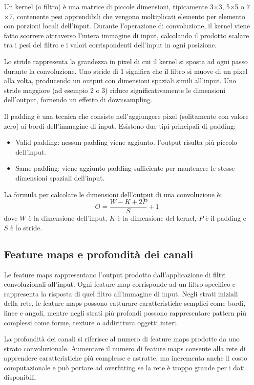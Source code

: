 \documentclass[a4paper,12pt]{report}
\begin{document}
	Un kernel (o filtro) è una matrice di piccole dimensioni, tipicamente 3$\times$3, 5$\times$5 o 7$\times$7, contenente pesi apprendibili che vengono moltiplicati elemento per elemento con porzioni locali dell'input. Durante l'operazione di convoluzione, il kernel viene fatto scorrere attraverso l'intera immagine di input, calcolando il prodotto scalare tra i pesi del filtro e i valori corrispondenti dell'input in ogni posizione.
	
	Lo stride rappresenta la grandezza in pixel di cui il kernel si sposta ad ogni passo durante la convoluzione. Uno stride di 1 significa che il filtro si muove di un pixel alla volta, producendo un output con dimensioni spaziali simili all'input. Uno stride maggiore (ad esempio 2 o 3) riduce significativamente le dimensioni dell'output, fornendo un effetto di downsampling.
	
	Il padding è una tecnica che consiste nell'aggiungere pixel (solitamente con valore zero) ai bordi dell'immagine di input. Esistono due tipi principali di padding:
	\begin{itemize}
		\item Valid padding: nessun padding viene aggiunto, l'output risulta più piccolo dell'input.
		\item Same padding: viene aggiunto padding sufficiente per mantenere le stesse dimensioni spaziali dell'input.
	\end{itemize}
	La formula per calcolare le dimensioni dell'output di una convoluzione è:
	$$O = \frac{W - K + 2P}{S} + 1$$
	dove $W$ è la dimensione dell'input, $K$ è la dimensione del kernel, $P$ è il padding e $S$ è lo stride.
	
	\subsection{Feature maps e profondità dei canali}
	Le feature maps rappresentano l'output prodotto dall'applicazione di filtri convoluzionali all'input. Ogni feature map corrisponde ad un filtro specifico e rappresenta la risposta di quel filtro all'immagine di input. Negli strati iniziali della rete, le feature maps possono catturare caratteristiche semplici come bordi, linee e angoli, mentre negli strati più profondi possono rappresentare pattern più complessi come forme, texture o addirittura oggetti interi.
	
	La profondità dei canali si riferisce al numero di feature maps prodotte da uno strato convoluzionale. Aumentare il numero di feature maps consente alla rete di apprendere caratteristiche più complesse e astratte, ma incrementa anche il costo computazionale e può portare ad overfitting se la rete è troppo grande per i dati disponibili.
	
\end{document}
